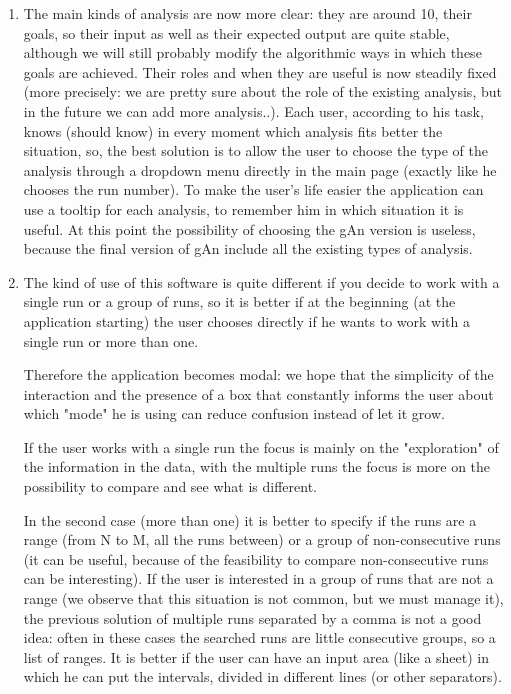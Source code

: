 \begin{enumerate}
\item 
The main kinds of analysis are now more clear: they are around 10, their goals, so their input as well as their expected output are quite stable, although we will still probably modify the algorithmic ways in which these goals are achieved. Their roles and when they are useful is now steadily fixed (more precisely: we are pretty sure about the role of the existing analysis, but in the future we can add more analysis..). Each user, according to his task, knows (should know) in every moment which analysis fits better the situation, so, the best solution is to allow the user to choose the type of the analysis through a dropdown menu directly in the main page (exactly like he chooses the run number). To make the user's life easier the application can use a tooltip for each analysis, to remember him in which situation it is useful. At this point the possibility of choosing the gAn version is useless, because the final version of gAn include all the existing types of analysis. 

\item 
The kind of use of this software is quite different if you decide to work with a single run or a group of runs, so it is better if at the beginning (at the application starting) the user chooses directly if he wants to work with a single run or more than one. 

Therefore the application becomes modal: we hope that the simplicity of the interaction and the presence of a box that constantly informs the user about which "mode" he is using can reduce confusion instead of let it grow.  

If the user works with a single run the focus is mainly on the "exploration" of the information in the data, with the multiple runs the focus is more on the possibility to compare and see what is different.

In the second case (more than one) it is better to specify if the runs are a range (from N to M, all the runs between) or a group of non-consecutive runs (it can be useful, because of the feasibility to compare non-consecutive runs can be interesting). If the user is interested in a group of runs that are not a range (we observe that this situation is not common, but we must manage it), the previous solution of multiple runs separated by a comma is not a good idea: often in these cases the searched runs are little consecutive groups, so a list of ranges. It is better if the user can have an input area (like a sheet) in which he can put the intervals, divided in different lines (or other separators).


\end{enumerate}
